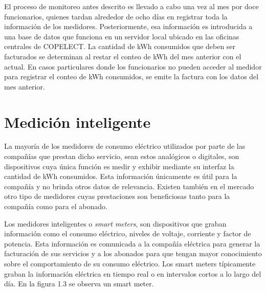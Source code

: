 El proceso de monitoreo antes descrito es llevado a cabo una vez al mes por doce funcionarios, quienes tardan alrededor de ocho días en registrar toda la información de los medidores. Posteriormente, esa información es introducida a una base de datos que funciona en un servidor local ubicado en las oficinas centrales de COPELECT. La cantidad de kWh consumidos que deben ser facturados se determinan al restar el conteo de kWh del mes anterior con el actual. En casos particulares donde los funcionarios no pueden acceder al medidor para registrar el conteo de kWh consumidos, se emite la factura con los datos del mes anterior.


\section{Medición inteligente}

La mayoría de los medidores de consumo eléctrico utilizados por parte de las compañías que prestan dicho servicio, sean estos analógicos o digitales, son dispositivos cuya única función es medir y exhibir mediante su interfaz la cantidad de kWh consumidos. Esta información únicamente es útil para la compañía y no brinda otros datos de relevancia. Existen también en el mercado otro tipo de medidores cuyas prestaciones son beneficiosas tanto para la compañía como para el abonado.

Los medidores inteligentes o \textit{smart meters}, son dispositivos que graban información como el consumo eléctrico, niveles de voltaje, corriente y factor de potencia. Esta información es comunicada a la compañía eléctrica para generar la facturación de sus servicios y a los abonados para que tengan mayor conocimiento sobre el comportamiento de su consumo eléctrico. Los smart meters típicamente graban la información eléctrica en tiempo real o en intervalos cortos a lo largo del día. En la figura 1.3 se observa un smart meter.

